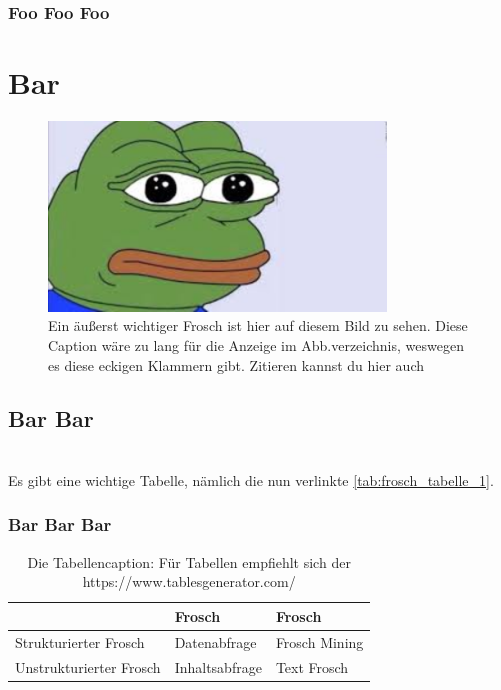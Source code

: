 \documentclass[
	12pt,
    a4paper,
    egregdoesnotlikesansseriftitles, %
    toc=chapterentrywithdots,
    oneside, openany,
    titlepage,
    parskip=half,
    headings=normal,  %
    listof=totoc,
    bibliography=totoc,
    index=totoc,
    captions=tableheading,  %
    listof=flat,
    numbers=noenddot, %
    final]
    {scrbook}
\begin{document}
\subsection{Foo Foo Foo}
\blindtext

\chapter{Bar}
\blindtext
\begin{figure}[h]
	\centering
	\includegraphics[width=0.8\textwidth]{figures/pepe-example.png}
	\caption[Kürzerer Text für Abb.verzeichnis]{Ein äußerst wichtiger Frosch ist hier auf diesem Bild zu sehen. Diese Caption wäre zu lang für die Anzeige im Abb.verzeichnis, weswegen es diese eckigen Klammern gibt. Zitieren kannst du hier auch \cite{albrecht_blueprints_2020}}
	\label{fig:pepe_der_frosch} %
\end{figure}
\blindtext

\section{Bar Bar}
\blindtext
\\Es gibt eine wichtige Tabelle, nämlich die nun verlinkte \autoref{tab:frosch_tabelle_1}.

\subsection{Bar Bar Bar}
\blindtext
	\begin{table}[h]
	\centering
		\begin{tabular}{l|l|l}
		                        & Frosch         & Frosch        \\ \hline
		Strukturierter Frosch   & Datenabfrage   & Frosch Mining \\ \hline
		Unstrukturierter Frosch & Inhaltsabfrage & Text Frosch
		\end{tabular}%
	\caption[Eine Tabelle über Frösche]{Die Tabellencaption: Für Tabellen empfiehlt sich der https://www.tablesgenerator.com/}
	\label{tab:frosch_tabelle_1}
	\end{table}
\blindtext
\end{document}
